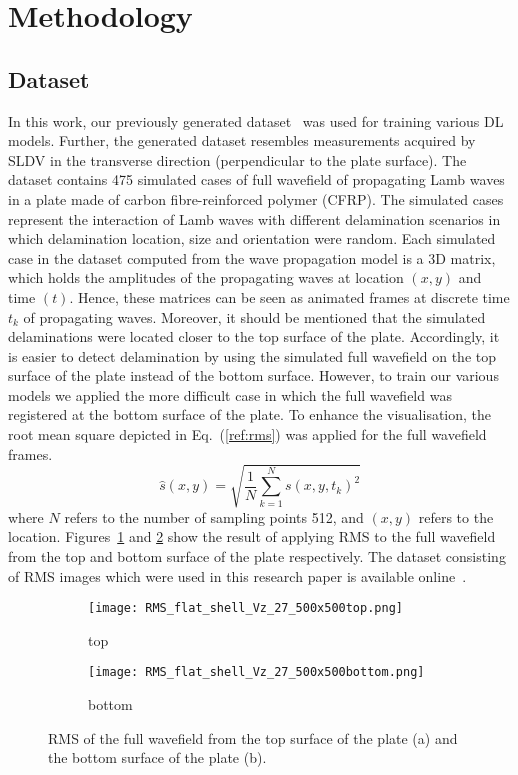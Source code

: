 \section{Methodology}
\label{methodology}
\subsection{Dataset}
In this work, our previously generated dataset~\cite{Ijjeh2021} was used for training various DL models.
Further, the generated dataset resembles measurements acquired by SLDV in the transverse direction (perpendicular to the plate surface).
The dataset contains 475 simulated cases of full wavefield of propagating Lamb waves in a plate made of carbon fibre-reinforced polymer (CFRP).
The simulated cases represent the interaction of Lamb waves with different delamination scenarios in which delamination location, size and orientation were random.
Each simulated case in the dataset computed from the wave propagation model is a 3D matrix, which holds the amplitudes of the propagating waves at location \((x,y)\) and time \((t)\).
Hence, these matrices can be seen as animated frames at discrete time \(t_k\) of propagating waves.
Moreover, it should be mentioned that the simulated delaminations were located closer to the top surface of the plate.
Accordingly, it is easier to detect delamination by using the simulated full wavefield on the top surface of the plate instead of the bottom surface.
However, to train our various models we applied the more difficult case in which the full wavefield was registered at the bottom surface of the plate.
To enhance the visualisation, the root mean square depicted in Eq.~(\ref{ref:rms}) was applied for the full wavefield frames.
\begin{equation}
	\hat{s}(x,y) = \sqrt{\frac{1}{N}\sum_{k=1}^{N} s(x,y,t_k)^2}
	\label{ref:rms}
\end{equation}
where \(N\) refers to the number of sampling points 512,  and \((x,y)\) refers to the location.
Figures~\ref{fig:rmstop} and \ref{fig:rmsbottom} show the result of applying RMS to the full wavefield from the top and bottom surface of the plate respectively.
The dataset consisting of RMS images which were used in this research paper is available online~\cite{Kudela2020d}.
\begin{figure} [h!]
	\centering
	\begin{subfigure}[b]{0.47\textwidth}
		\centering
		\texttt{[image: RMS\_flat\_shell\_Vz\_27\_500x500top.png]}
		\caption{top}
		\label{fig:rmstop}
	\end{subfigure}
	\hfill
	\begin{subfigure}[b]{0.47\textwidth}
		\centering
		\texttt{[image: RMS\_flat\_shell\_Vz\_27\_500x500bottom.png]}
		\caption{bottom}
		\label{fig:rmsbottom}
	\end{subfigure}
	\caption{RMS of the full wavefield from the top surface of the plate (a) and the bottom surface of the plate (b).}
\label{fig:rms}
\end{figure} 
